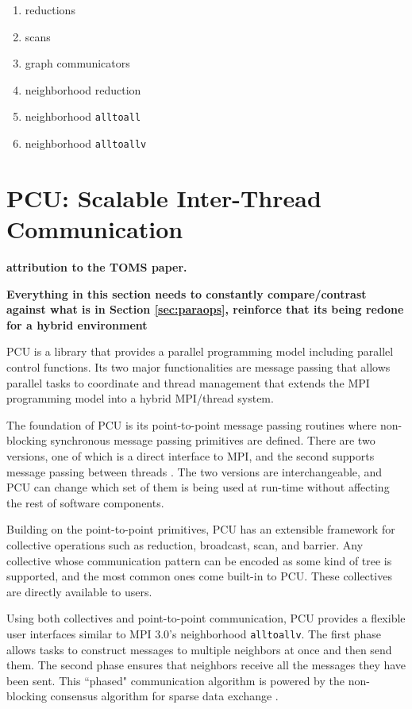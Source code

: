 \begin{enumerate}
\item reductions
\item scans
\item graph communicators
\item neighborhood reduction
\item neighborhood \texttt{alltoall}
\item neighborhood \texttt{alltoallv}
\end{enumerate}

\section{PCU: Scalable Inter-Thread Communication}
\label{sec:pcu}

{\bf attribution to the TOMS paper.}

{\bf Everything in this section needs to constantly
compare/contrast against what is in Section \ref{sec:paraops},
reinforce that its being redone for a hybrid environment}

PCU is a library that provides a parallel programming model including
parallel control functions.
Its two major functionalities are message passing that allows parallel tasks to
coordinate and thread management that extends the MPI programming model
into a hybrid MPI/thread system.

The foundation of PCU is its point-to-point message passing routines where
non-blocking synchronous message passing primitives are defined. There are
two versions, one of which is a direct interface to MPI, and the second supports
message passing between threads \cite{ibanez2014hybrid}. The two versions
are interchangeable, and PCU can change which set of them is being used at
run-time without affecting the rest of software components.

Building on the point-to-point primitives, PCU has an extensible framework for
collective operations such as reduction, broadcast, scan, and barrier.
Any collective whose communication pattern can be encoded as some kind of tree
is supported, and the most common ones come built-in to PCU.
These collectives are directly available to users.

Using both collectives and point-to-point communication, PCU provides a flexible
user interfaces similar to MPI 3.0's neighborhood \texttt{alltoallv}.
The first phase
allows tasks to construct messages to multiple neighbors
at once and then send them.
The second phase ensures that neighbors
receive all the messages they have been sent.
This ``phased" communication algorithm is
powered by the non-blocking consensus algorithm
for sparse data exchange \cite{hoefler2010scalable}.

